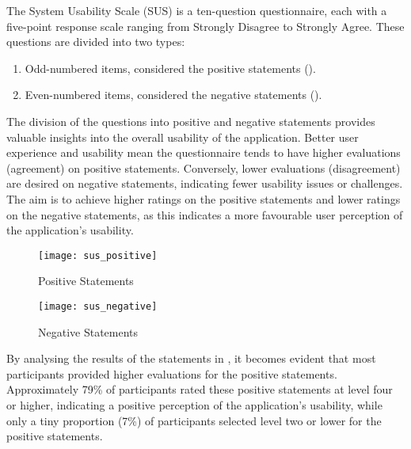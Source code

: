 The System Usability Scale (SUS) is a ten-question questionnaire, each with a
five-point response scale ranging from Strongly Disagree to Strongly Agree.
These questions are divided into two types:

\begin{enumerate}
  \item Odd-numbered items, considered the positive statements
    ().
  \item Even-numbered items, considered the negative statements
    ().
\end{enumerate}

The division of the questions into positive and negative statements provides
valuable insights into the overall usability of the application. Better user
experience and usability mean the questionnaire tends to have higher
evaluations (agreement) on positive statements. Conversely, lower evaluations
(disagreement) are desired on negative statements, indicating fewer usability
issues or challenges. The aim is to achieve higher ratings on the positive
statements and lower ratings on the negative statements, as this indicates a
more favourable user perception of the application's usability.

\begin{figure*}[!htb]
  \caption{Statements Results SUS}
  \label{fig:statements_results_sus}
  \centering
  \begin{subfigure}[b]{1\textwidth}
    \caption{Positive Statements}
    \label{fig:statements_results_sus_positive}
    \texttt{[image: sus\_positive]}
  \end{subfigure}
  \hfill
  \begin{subfigure}[b]{1\textwidth}
    \caption{Negative Statements}
    \label{fig:statements_results_sus_negative}
    \texttt{[image: sus\_negative]}
  \end{subfigure}
\end{figure*}

By analysing the results of the statements in
, it becomes evident that most participants
provided higher evaluations for the positive statements. Approximately 79\% of
participants rated these positive statements at level four or higher,
indicating a positive perception of the application's usability, while only a
tiny proportion (7\%) of participants selected level two or lower for the
positive statements.

